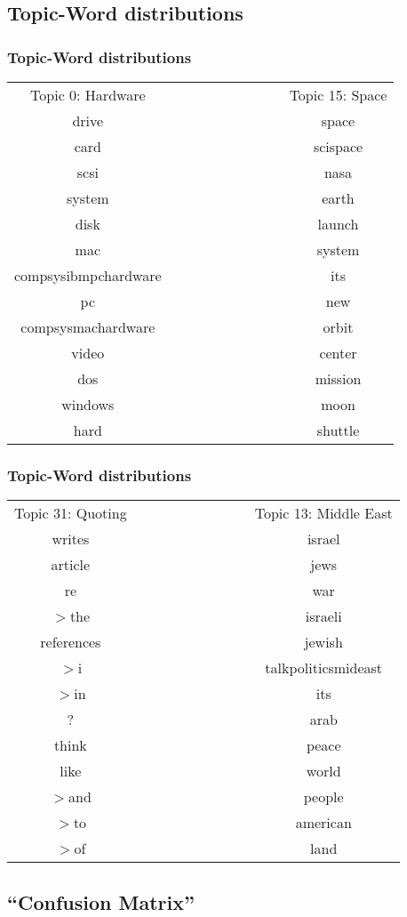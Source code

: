\documentclass{beamer}
\begin{document}
\subsection{Topic-Word distributions}
\begin{frame}
  \frametitle{Topic-Word distributions}
  \begin{tabular}{|c|c|c|}
	Topic 0: Hardware&\ \ \ \ \ \ \ \ \ \ \ \ \ \ &Topic 15: Space \\
	drive&&space \\
	card&&scispace \\
	scsi&&nasa \\
	system&&earth \\
	disk&&launch \\
	mac&&system \\
	compsysibmpchardware&&its \\
	pc&&new \\
	compsysmachardware&&orbit \\
	video&&center \\
	dos&&mission \\
	windows&&moon \\
	hard&&shuttle \\
  \end{tabular}
\end{frame}
\begin{frame}
  \frametitle{Topic-Word distributions}
  \begin{tabular}{|c|c|c|}
	Topic 31: Quoting&\ \ \ \ \ \ \ \ \ \ \ \ \ \ &Topic 13: Middle East \\
	writes&&israel \\
	article&&jews \\
	re&&war \\
	$>$the&&israeli \\
	references&&jewish \\
	$>$i&&talkpoliticsmideast \\
	$>$in&&its \\
	?&&arab \\
	think&&peace \\
	like&&world \\
	$>$and&&people \\
	$>$to&&american \\
	$>$of&&land \\
  \end{tabular}
\end{frame}

\subsection{``Confusion Matrix''}
\end{document}
